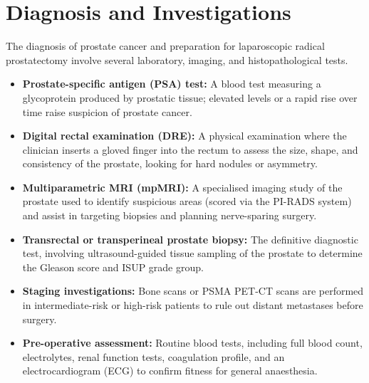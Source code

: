 \section*{Diagnosis and Investigations}
The diagnosis of prostate cancer and preparation for laparoscopic radical prostatectomy involve several laboratory, imaging, and histopathological tests.
\begin{itemize}
    \item \textbf{Prostate-specific antigen (PSA) test:} A blood test measuring a glycoprotein produced by prostatic tissue; elevated levels or a rapid rise over time raise suspicion of prostate cancer.
    \item \textbf{Digital rectal examination (DRE):} A physical examination where the clinician inserts a gloved finger into the rectum to assess the size, shape, and consistency of the prostate, looking for hard nodules or asymmetry.
    \item \textbf{Multiparametric MRI (mpMRI):} A specialised imaging study of the prostate used to identify suspicious areas (scored via the PI-RADS system) and assist in targeting biopsies and planning nerve-sparing surgery.
    \item \textbf{Transrectal or transperineal prostate biopsy:} The definitive diagnostic test, involving ultrasound-guided tissue sampling of the prostate to determine the Gleason score and ISUP grade group.
    \item \textbf{Staging investigations:} Bone scans or PSMA PET-CT scans are performed in intermediate-risk or high-risk patients to rule out distant metastases before surgery.
    \item \textbf{Pre-operative assessment:} Routine blood tests, including full blood count, electrolytes, renal function tests, coagulation profile, and an electrocardiogram (ECG) to confirm fitness for general anaesthesia.
\end{itemize}

